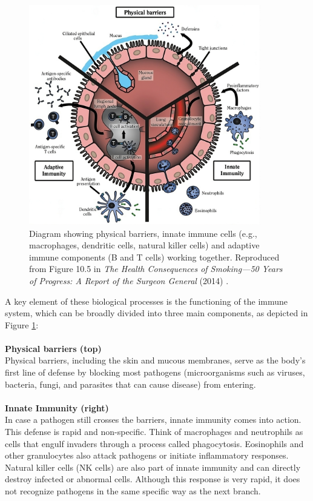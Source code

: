 \documentclass[12pt,a4paper]{report}
\begin{document}
\begin{figure}[h]
  \centering
  \includegraphics[width=0.9\textwidth]{images/Diagram_of_innate_and_adaptive_immunity.jpeg}
  \caption[Diagram of Innate and Adaptive Immunity]{Diagram showing physical barriers, innate immune cells (e.g., macrophages, dendritic cells, natural killer cells) and adaptive immune components (B and T cells) working together. Reproduced from Figure 10.5 in \emph{The Health Consequences of Smoking—50 Years of Progress: A Report of the Surgeon General} (2014) \cite{smoking2014}.}
  \label{fig:immunity}
\end{figure}
A key element of these biological processes is the functioning of the immune system, which can be broadly divided into three main components, as depicted in Figure \ref{fig:immunity}:\\
\\
\textbf{Physical barriers (top)}\\
Physical barriers, including the skin and mucous membranes, serve as the body’s first line of defense by blocking most pathogens (microorganisms such as viruses, bacteria, fungi, and parasites that can cause disease) from entering.\\
\\
\textbf{Innate Immunity (right)}\\
In case a pathogen still crosses the barriers, innate immunity comes into action. This defense is rapid and non-specific. Think of macrophages and neutrophils as cells that engulf invaders through a process called phagocytosis. Eosinophils and other granulocytes also attack pathogens or initiate inflammatory responses. Natural killer cells (NK cells) are also part of innate immunity and can directly destroy infected or abnormal cells. Although this response is very rapid, it does not recognize pathogens in the same specific way as the next branch. \cite{janeway2001immunobiology}\\
\end{document}
